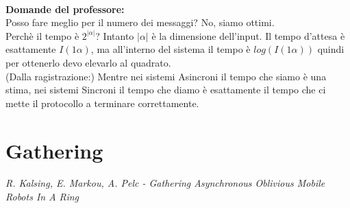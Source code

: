 \\
\textbf{Domande del professore:}\\
Posso fare meglio per il numero dei messaggi? No, siamo ottimi.\\
Perchè il tempo è $2^{|\alpha|}$? Intanto $|\alpha|$ è la dimensione dell'input. Il tempo d'attesa è esattamente $I(1\alpha)$, ma all'interno del sistema il tempo è $log(I(1\alpha))$ quindi per ottenerlo devo elevarlo al quadrato.\\
(Dalla ragistrazione:) Mentre nei sistemi Asincroni il tempo che siamo è una stima, nei sistemi Sincroni il tempo che diamo è esattamente il tempo che ci mette il protocollo a terminare correttamente.


\chapter{Gathering}
\emph{R. Kalsing, E. Markou, A. Pelc - Gathering Asynchronous Oblivious Mobile Robots In A Ring}

